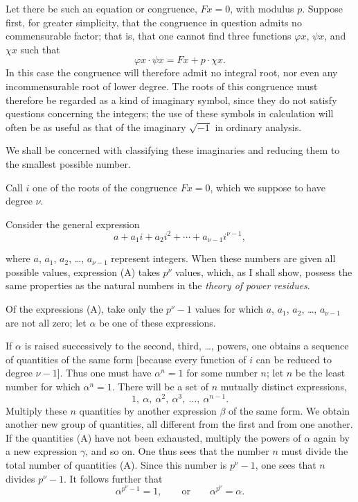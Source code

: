 Let there be such an equation or congruence, $Fx=0$, with modulus $p$.
Suppose first, for greater simplicity, that the congruence in question
admits no commensurable factor; that is, that one cannot find three
functions $\varphi x$, $\psi x$, and $\chi x$ such that
\[
\varphi x\mathbin{\cdot}\psi x=Fx+p\mathbin{\cdot}\chi x.
\]
In this case the congruence will therefore admit no integral root, nor
even any incommensurable root of lower degree. The roots of this
congruence must therefore be regarded as a kind of imaginary symbol,
since they do not satisfy questions concerning the integers; the use of
these symbols in calculation will often be as useful as that of the
imaginary $\sqrt{-1}$ in ordinary analysis.

We shall be concerned with classifying these imaginaries and reducing
them to the smallest possible number.

Call $i$ one of the roots of the congruence $Fx=0$, which we suppose
to have degree $\nu$.

Consider the general expression
\[
\tag{A}
a+a_1i+a_2i^2+\cdots+a_{\nu-1}i^{\nu-1},
\]


where $a$, $a_1$, $a_2$, \ldots, $a_{\nu-1}$ represent integers. When
these numbers are given all possible values, expression (A) takes
$p^\nu$ values, which, as I shall show, possess the same properties as
the natural numbers in the \emph{theory of power residues}.

Of the expressions (A), take only the $p^\nu-1$ values for which $a$,
$a_1$, $a_2$, \ldots, $a_{\nu-1}$ are not all zero; let $\alpha$ be one
of these expressions.

If $\alpha$ is raised successively to the second, third, \ldots,
powers, one obtains a sequence of quantities of the same form [because
every function of $i$ can be reduced to degree $\nu-1$]. Thus one must
have $\alpha^n=1$ for some number $n$; let $n$ be the least number for
which $\alpha^n=1$. There will be a set of $n$ mutually distinct
expressions,
\[
1,\ \alpha,\ \alpha^2,\ \alpha^3,\ \ldots,\ \alpha^{n-1}.
\]
Multiply these $n$ quantities by another expression $\beta$ of the same
form. We obtain another new group of quantities, all different from the
first and from one another. If the quantities (A) have not been
exhausted, multiply the powers of $\alpha$ again by a new expression
$\gamma$, and so on. One thus sees that the number $n$ must divide the
total number of quantities (A). Since this number is $p^\nu-1$, one sees
that $n$ divides $p^\nu-1$. It follows further that
\[
\alpha^{p^\nu-1}=1,\qquad\text{or}\qquad \alpha^{p^\nu}=\alpha.
\]

